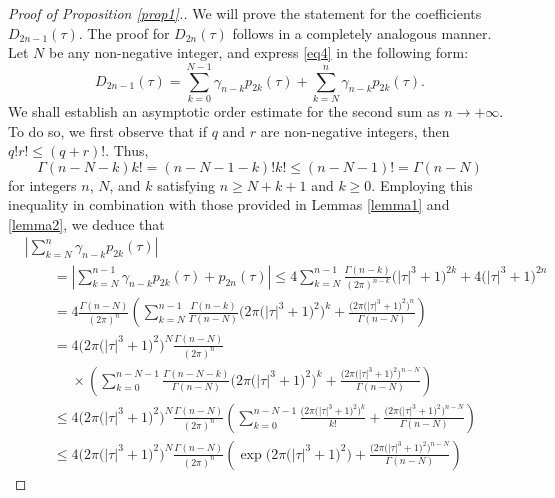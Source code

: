 \documentclass[11pt]{article}
\numberwithin{equation}{section}
\numberwithin{equation}{section}
\begin{document}
\begin{proof}[Proof of Proposition \ref{prop1}.] We will prove the statement for the coefficients $D_{2n - 1} (\tau )$. The proof for $D_{2n} (\tau)$ follows in a completely analogous manner. Let $N$ be any non-negative integer, and express \eqref{eq4} in the following form:
\begin{equation}\label{eq20}
D_{2n - 1} (\tau ) = \sum_{k = 0}^{N - 1}\gamma _{n - k} p_{2k} (\tau ) + \sum_{k = N}^n \gamma _{n - k} p_{2k} (\tau ).
\end{equation}
We shall establish an asymptotic order estimate for the second sum as $n\to+\infty$. To do so, we first observe that if $q$ and $r$ are non-negative integers, then $q!r! \le (q + r)!$. Thus,
\[
\Gamma (n - N - k)k! = (n - N - 1 - k)!k! \le (n - N - 1)! = \Gamma (n - N)
\]
for integers $n$, $N$, and $k$ satisfying $n \ge N+k+1$ and $k\ge 0$. Employing this inequality in combination with those provided in Lemmas \ref{lemma1} and \ref{lemma2}, we deduce that
\begin{align*}
& \left| \sum_{k = N}^n \gamma _{n - k} p_{2k} (\tau ) \right| \\
&\qquad= \left| \sum_{k = N}^{n-1} \gamma _{n - k} p_{2k} (\tau ) + p_{2n} (\tau )\right| \le 4\sum_{k = N}^{n - 1} \frac{\Gamma (n - k)}{(2\pi )^{n - k} }\bigl(\left| \tau \right|^3 + 1\bigr)^{2k} + 4\bigl(\left| \tau \right|^3 + 1\bigr)^{2n}
\\ & \qquad= 4\frac{\Gamma (n - N)}{(2\pi )^n }\left( \sum_{k = N}^{n - 1} \frac{\Gamma (n - k)}{\Gamma(n - N)}\big(2\pi \bigl(\left| \tau \right|^3 + 1\bigr)^2 \big)^k + \frac{\big(2\pi \bigl(\left| \tau \right|^3 + 1\bigr)^2 \big)^n }{\Gamma (n - N)} \right)
\\ & \qquad= 4\big(2\pi \bigl(\left| \tau \right|^3 + 1\bigr)^2 \big)^N \frac{\Gamma(n - N)}{(2\pi )^n }\\
&\phantom{\qquad=}{}\times\left( \sum_{k = 0}^{n - N - 1} \frac{\Gamma (n - N - k)}{\Gamma (n - N)}\big(2\pi \bigl(\left| \tau \right|^3 + 1\bigr)^2 \big)^k + \frac{\big(2\pi \bigl(\left| \tau \right|^3 + 1\bigr)^2 \big)^{n - N} }{\Gamma(n - N)} \right)
\\ & \qquad\le 4\big(2\pi \bigl(\left| \tau \right|^3 + 1\bigr)^2 \big)^N \frac{\Gamma(n - N)}{(2\pi )^n }\left( \sum_{k = 0}^{n - N - 1} \frac{\big(2\pi \bigl(\left| \tau \right|^3 + 1\bigr)^2 \big)^k }{k!} + \frac{\big(2\pi \bigl(\left| \tau \right|^3 + 1\bigr)^2 \big)^{n - N} }{\Gamma(n - N)}\right)
\\ & \qquad\le 4\big(2\pi \bigl(\left| \tau \right|^3 + 1\bigr)^2 \big)^N \frac{\Gamma(n - N)}{(2\pi )^n }\left( \exp \big( 2\pi \bigl(\left| \tau \right|^3 + 1\bigr)^2 \big) + \frac{\big(2\pi \bigl(\left| \tau \right|^3 + 1\bigr)^2 \big)^{n - N} }{\Gamma(n - N)} \right)

\end{align*}
\end{proof}
\end{document}
